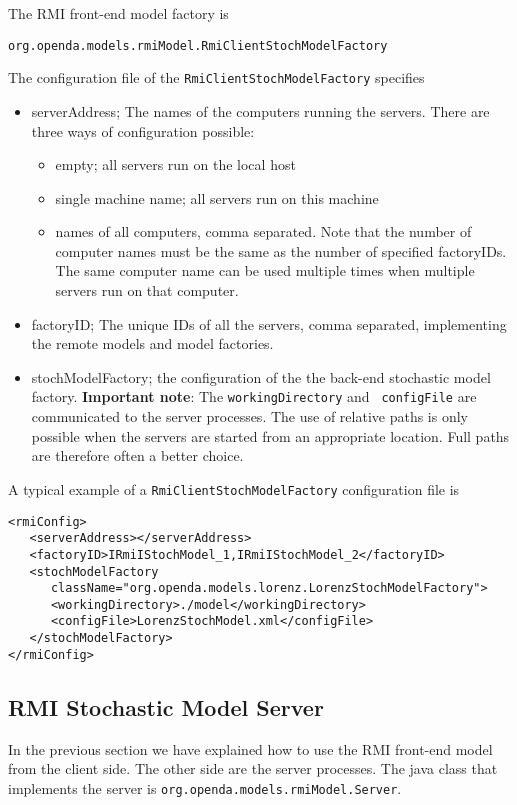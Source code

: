 The RMI front-end model factory is
\begin{verbatim}
org.openda.models.rmiModel.RmiClientStochModelFactory
\end{verbatim}
The configuration file of the {\tt RmiClientStochModelFactory} specifies
\begin{itemize}
\item serverAddress; The names of the computers running the servers. There are
  three ways of configuration possible:
  \begin{itemize}
  \item empty; all servers run on the local host
  \item single machine name; all servers run on this machine
  \item names of all computers, comma separated. Note that the number of
    computer names must be the same as the number of specified factoryIDs. The
    same computer name can be used multiple times when multiple servers run on
    that computer.
  \end{itemize}
\item factoryID; The unique IDs of all the servers, comma separated,
  implementing the remote models and model factories.
\item stochModelFactory; the configuration of the the back-end stochastic model
  factory. {\bf Important note}: The {\tt workingDirectory} and {\tt
    configFile} are communicated to the server processes. The use of relative
  paths is only possible when the servers are started from an appropriate
  location. Full paths are therefore often a better choice.
\end{itemize}

A typical example of a {\tt RmiClientStochModelFactory} configuration file is
{\small
\begin{verbatim}
<rmiConfig>
   <serverAddress></serverAddress>
   <factoryID>IRmiIStochModel_1,IRmiIStochModel_2</factoryID>
   <stochModelFactory
      className="org.openda.models.lorenz.LorenzStochModelFactory">
      <workingDirectory>./model</workingDirectory>
      <configFile>LorenzStochModel.xml</configFile>
   </stochModelFactory>
</rmiConfig>
\end{verbatim}
}

\subsection{RMI Stochastic Model Server}
In the previous section we have explained how to use the RMI front-end model
from the client side. The other side are the server processes. The java class
that implements the server is {\tt org.openda.models.rmiModel.Server}.

